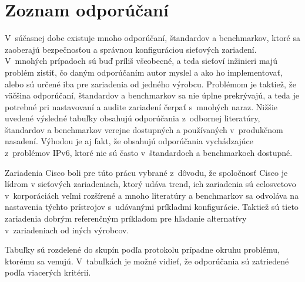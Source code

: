 \newpage
\section{Zoznam odporúčaní}
\label{check_list}

V~súčasnej dobe existuje mnoho odporúčaní, štandardov a benchmarkov, ktoré sa zaoberajú bezpečnosťou a správnou konfiguráciou sieťových zariadení. V~mnohých prípadoch sú buď príliš všeobecné, a teda sieťoví inžinieri majú problém zistiť, čo daným odporúčaním autor myslel a ako ho implementovať, alebo sú určené iba pre zariadenia od jedného výrobcu. Problémom je taktiež, že väčšina odporúčaní, štandardov a benchmarkov sa nie úplne prekrývajú, a teda je potrebné pri nastavovaní a audite zariadení čerpať s~mnohých naraz. Nižšie uvedené výsledné tabuľky obsahujú odporúčania z~odbornej literatúry, štandardov a benchmarkov verejne dostupných a používaných v~produkčnom nasadení. Výhodou je aj fakt, že obsahujú odporúčania vychádzajúce z~problémov IPv6, ktoré nie sú často v~štandardoch a benchmarkoch dostupné. 

Zariadenia Cisco boli pre túto prácu vybrané z~dôvodu, že spoločnosť Cisco je lídrom v sieťových zariadeniach, ktorý udáva trend, ich zariadenia sú celosvetovo v~korporáciách veľmi rozšírené a mnoho literatúry a benchmarkov sa odvoláva na nastavenia týchto prístrojov s~udávanými príkladmi konfigurácie. Taktiež sú tieto zariadenia dobrým referenčným príkladom pre hľadanie alternatívy v~zariadeniach od iných výrobcov.

Tabuľky sú rozdelené do skupín podľa protokolu prípadne okruhu problému, ktorému sa venujú. V~tabuľkách je možné vidieť, že odporúčania sú zatriedené podľa viacerých kritérií. %

